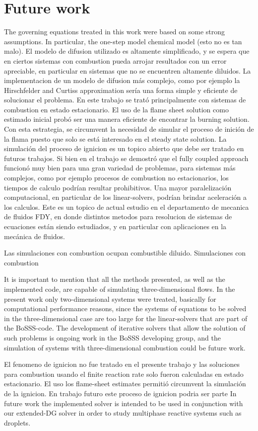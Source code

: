 \section{Future work}
The governing equations treated in this work were based on some strong assumptions. In particular, the one-step model chemical model (esto no es tan malo).
El modelo de difusion utilizado es altamente simplificado, y se espera que en ciertos sistemas con combustion pueda arrojar resultados con un error apreciable, en particular en sistemas que no se encuentren altamente diluidos. La implementacion de un modelo de difusion más complejo, como por ejemplo la Hirschfelder and Curtiss approximation sería una forma simple y eficiente de solucionar el problema. 
En este trabajo se trató principalmente con sistemas de combustion en estado estacionario. El uso de la flame sheet solution como estimado inicial probó ser una manera eficiente de encontrar la burning solution. Con esta estrategia, se circumvent la necesidad de simular el proceso de inición de la flama puesto  que solo se está interesado en el steady state solution.  La simulación del proceso de ignicion es un topico abierto que debe ser tratado en futuros trabajos. 
Si bien en el trabajo se demostró que el fully coupled approach funcionó muy bien para una gran variedad de problemas, para sistemas más complejos, como por ejemplo procesos de combustion no estacionarios, los tiempos de calculo podrían resultar prohibitivos. Una mayor paralelización computacional, en particular de los linear-solvers, podrían brindar aceleración a los calculos. Este es un topico de actual estudio en el departamento de mecanica de fluidos FDY, en donde distintos metodos para resolucion de sistemas de ecuaciones están siendo estudiados, y en particular con aplicaciones en la mecánica de fluidos. 

Las simulaciones con combustion ocupan combustible diluido. Simulaciones con combustion     

It is important to mention that all the methods presented, as well as the implemented code, are capable of simulating three-dimensional flows. In the present work only two-dimensional systems were treated, basically for computational performance reasons, since the systems of equations to be solved in the three-dimensional case are too large for the linear-solvers that are part of the BoSSS-code. The development of iterative solvers that allow the solution of such problems is ongoing work in the BoSSS developing group, and the simulation of systems with three-dimensional combustion could be future work.

El fenomeno de ignicion no fue tratado en el presente trabajo y las soluciones para combustion usando el finite reaction rate solo fueron calculadas en estado estacionario. El uso los flame-sheet estimates permitió circumvent la simulación de la ignicion. En trabajo futuro este proceso de ignicion podria ser parte 
In future work the implemented solver is intended to be used in conjunction with our extended-DG solver \textcite{kummerExtendedDiscontinuousGalerkin2017,kummerBoSSSPackageMultigrid2021,krauseIncompressibleImmersedBoundary2017}in order to study multiphase reactive systems such as droplets.


